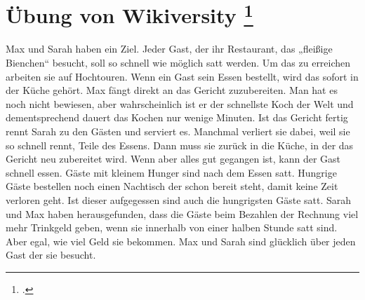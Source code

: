 \documentclass{bschlangaul-aufgabe}
\begin{document}

\section{Übung von Wikiversity
\footcite{net:pdf:wikiversity:zustandsdiagramm}}

Max und Sarah haben ein Ziel. Jeder Gast, der ihr Restaurant, das
„fleißige Bienchen“ besucht, soll so schnell wie möglich satt werden. Um
das zu erreichen arbeiten sie auf Hochtouren. Wenn ein Gast sein Essen
bestellt, wird das sofort in der Küche gehört. Max fängt direkt an das
Gericht zuzubereiten. Man hat es noch nicht bewiesen, aber
wahrscheinlich ist er der schnellste Koch der Welt und dementsprechend
dauert das Kochen nur wenige Minuten. Ist das Gericht fertig rennt Sarah
zu den Gästen und serviert es. Manchmal verliert sie dabei, weil sie so
schnell rennt, Teile des Essens. Dann muss sie zurück in die Küche, in
der das Gericht neu zubereitet wird. Wenn aber alles gut gegangen ist,
kann der Gast schnell essen. Gäste mit kleinem Hunger sind nach dem
Essen satt. Hungrige Gäste bestellen noch einen Nachtisch der schon
bereit steht, damit keine Zeit verloren geht. Ist dieser aufgegessen
sind auch die hungrigsten Gäste satt. Sarah und Max haben
herausgefunden, dass die Gäste beim Bezahlen der Rechnung viel mehr
Trinkgeld geben, wenn sie innerhalb von einer halben Stunde satt sind.
Aber egal, wie viel Geld sie bekommen. Max und Sarah sind glücklich über
jeden Gast der sie besucht.

\end{document}
